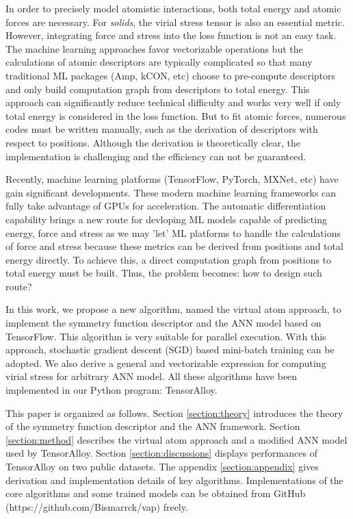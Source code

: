 \documentclass[preprint]{revtex4-2}
\begin{document}
In order to precisely model atomistic interactions, both total energy and atomic 
forces are necessary. For \textit{solids}, the virial stress tensor is also an
essential metric. However, integrating force and stress into the loss function 
is not an easy task. The machine learning approaches favor vectorizable 
operations but the calculations of atomic descriptors are typically complicated 
so that many traditional ML packages (Amp, kCON, etc) choose to pre-compute 
descriptors and only build computation graph from descriptors to total energy. 
This approach can significantly reduce technical difficulty and works very well 
if only total energy is considered in the loss function. But to fit atomic 
forces, numerous codes must be written manually, such as the derivation of 
descriptors with respect to positions. Although the derivation is theoretically
clear, the implementation is challenging and the efficiency can not be 
guaranteed.

Recently, machine learning platforms (TensorFlow\cite{tensorflow}, 
PyTorch\cite{pytorch}, MXNet\cite{MXNet}, etc) have gain significant 
developments. These modern machine learning frameworks can fully take advantage 
of GPUs for acceleration. The automatic differentiation capability brings a new 
route for devloping ML models capable of predicting energy, force and stress as 
we may 'let' ML platforms to handle the calculations of force and stress because 
these metrics can be derived from positions and total energy directly. To 
achieve this, a direct computation graph from positions to total energy must be
built. Thus, the problem becomes: how to design such route?

In this work, we propose a new algorithm, named the virtual atom approach, to 
implement the symmetry function descriptor and the ANN model based on 
TensorFlow. This algorithm is very suitable for parallel execution. With this 
approach, stochastic gradient descent (SGD) based mini-batch training can be 
adopted. We also derive a general and vectorizable expression for computing 
virial stress for arbitrary ANN model. All these algorithms have been 
implemented in our Python program: TensorAlloy. 

This paper is organized as follows. Section \ref{section:theory} introduces the 
theory of the symmetry function descriptor and the ANN framework. Section 
\ref{section:method} describes the virtual atom approach and a modified ANN 
model used by TensorAlloy. Section \ref{section:discussions} displays 
performances of TensorAlloy on two public datasets. The appendix 
\ref{section:appendix} gives derivation and implementation details of key 
algorithms. Implementations of the core algorithms and some trained models can 
be obtained from GitHub (https://github.com/Bismarrck/vap) freely.
\end{document}
